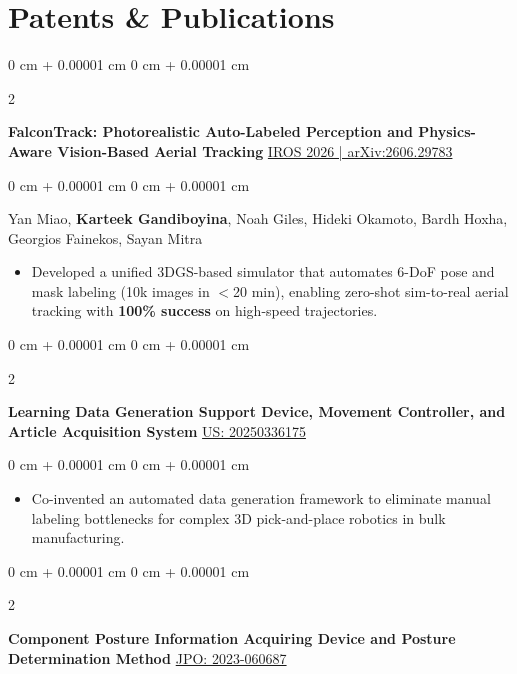 \documentclass[10pt, letterpaper]{article}
\newenvironment{highlights}{
    \begin{itemize}[
        topsep=0.10 cm,
        parsep=0.10 cm,
        partopsep=0pt,
        itemsep=0pt,
        leftmargin=0 cm + 10pt
    ]
}{
    \end{itemize}
} %
\newenvironment{onecolentry}{
    \begin{adjustwidth}{
        0 cm + 0.00001 cm
    }{
        0 cm + 0.00001 cm
    }
}{
    \end{adjustwidth}
} %
\newenvironment{twocolentry}[2][]{
    \onecolentry
    \def\secondColumn{#2}
    \setcolumnwidth{\fill, 4.5 cm}
    \begin{paracol}{2}
}{
    \switchcolumn \raggedleft \secondColumn
    \end{paracol}
    \endonecolentry
} %
\begin{document}
   \section{Patents \& Publications}

        \begin{twocolentry}{
            \href{https://arxiv.org/abs/2606.29783}{IROS 2026 | arXiv:2606.29783}
        }
            \textbf{FalconTrack: Photorealistic Auto-Labeled Perception and Physics-Aware Vision-Based Aerial Tracking}\end{twocolentry}

        \vspace{0.05 cm}
        \begin{onecolentry}
            Yan Miao, \textbf{Karteek Gandiboyina}, Noah Giles, Hideki Okamoto, Bardh Hoxha, Georgios Fainekos, Sayan Mitra
            \begin{highlights}
                \item Developed a unified 3DGS-based simulator that automates 6-DoF pose and mask labeling (10k images in $<$20 min), enabling zero-shot sim-to-real aerial tracking with \textbf{100\% success} on high-speed trajectories.
            \end{highlights}
        \end{onecolentry}

        \vspace{0.1 cm}

        \begin{twocolentry}{
            \href{https://patents.google.com/patent/US20250336175A1/en}{US: 20250336175}
        }
            \textbf{Learning Data Generation Support Device, Movement Controller, and Article Acquisition System}\end{twocolentry}

        \vspace{0.05 cm}
        \begin{onecolentry}
            \begin{highlights}
                \item Co-invented an automated data generation framework to eliminate manual labeling bottlenecks for complex 3D pick-and-place robotics in bulk manufacturing.
            \end{highlights}
        \end{onecolentry}

        \vspace{0.1 cm}

        \begin{twocolentry}{
            \href{https://patents.justia.com/patent/20240338849}{JPO: 2023-060687}
        }
            \textbf{Component Posture Information Acquiring Device and Posture Determination Method}\end{twocolentry}
\end{document}
